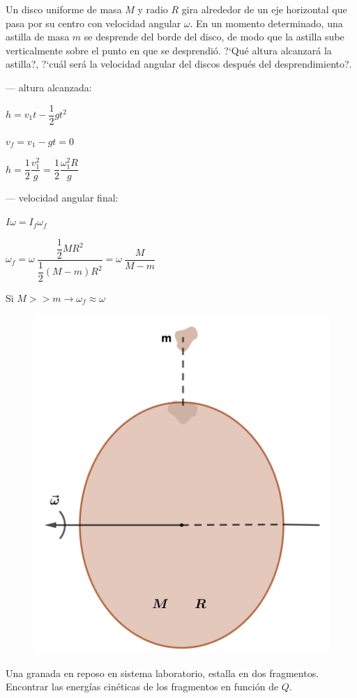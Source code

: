 \vspace{5mm} %
\begin{prob}
	Un disco uniforme de masa $M$ y radio $R$ gira alrededor de un eje horizontal que pasa por su centro con velocidad angular $\omega$. En un momento determinado, una astilla de masa $m$ se desprende del borde del disco, de modo que la astilla sube verticalmente sobre el punto en que se desprendió. ?`Qué altura alcanzará la astilla?, ?`cuál será la velocidad angular del discos después del desprendimiento?.
\end{prob}

\begin{multicols}{2}
--- altura alcanzada:

$h=v_1t-\dfrac 1 2 g t^2$

$v_f=v_1-gt=0$

$h=\dfrac 1 2 \dfrac{v_1^2}{g}=\dfrac 1 2 \dfrac{\omega_1^2 R}{g}$

--- velocidad angular final:

$I\omega=I_f \omega_f$

$\omega_f=\omega\  \dfrac{\dfrac 1 2 MR^2}{\dfrac 1 2 (M-m)R^2}=\omega \  \dfrac{M}{M-m}$

Si $M>>m \to \omega_f \approx \omega$
\begin{figure}[H]
	\centering
	\includegraphics[width=.55\textwidth]{imagenes/imagenes17/T17IM11.png}
	\end{figure}	
\end{multicols}

\begin{prob}
Una granada en reposo en sistema laboratorio, estalla en dos fragmentos. Encontrar las energías cinéticas de los fragmentos en función de $Q$.	
\end{prob}

